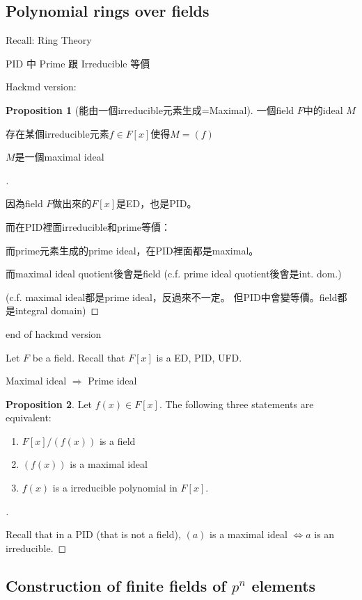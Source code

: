 \documentclass[12pt]{article}
\theoremstyle{definition}
\newtheorem{prop}{Proposition}
\newenvironment{proofs}[1][\proofname]{%
  \begin{proof}[#1]$ $\par\nobreak\ignorespaces
}{%
  \end{proof}
}
\begin{document}
\subsection{Polynomial rings over fields}

Recall: Ring Theory

PID 中 Prime 跟 Irreducible 等價


Hackmd version:

\begin{prop}[能由一個irreducible元素生成=Maximal]
	一個field $F$中的ideal $M$

	存在某個irreducible元素$f\in F[x]$使得$M=(f)$

	$M$是一個maximal ideal
\end{prop}

\begin{proofs}
	因為field $F$做出來的$F[x]$是ED，也是PID。

	而在PID裡面irreducible和prime等價：

	而prime元素生成的prime ideal，在PID裡面都是maximal。

	而maximal ideal quotient後會是field (c.f. prime ideal quotient後會是int. dom.)

	(c.f. maximal ideal都是prime ideal，反過來不一定。
	但PID中會變等價。field都是integral domain)
\end{proofs}
end of hackmd version

Let $F$ be a field. Recall that $F[x]$ is a ED, PID, UFD.

Maximal ideal $\Rightarrow$ Prime ideal


\begin{prop}
	Let $f(x) \in F[x]$. The following three statements are equivalent:
	\begin{enumerate}
		\item $F[x]/(f(x))$ is a field
		\item $(f(x))$ is a maximal ideal
		\item $f(x)$ is a irreducible polynomial in $F[x]$.
	\end{enumerate}
\end{prop}

\begin{proofs}
	Recall that in a PID (that is not a field), $(a)$ is a maximal ideal $\Leftrightarrow a$ is an irreducible.
\end{proofs}

\subsection*{Construction of finite fields of $p^n$ elements}
\end{document}
